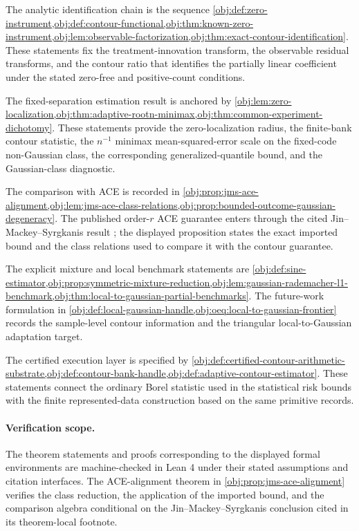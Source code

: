 \documentclass[11pt]{article}
\begin{document}
The analytic identification chain is the sequence \cref{obj:def:zero-instrument,obj:def:contour-functional,obj:thm:known-zero-instrument,obj:lem:observable-factorization,obj:thm:exact-contour-identification}. These statements fix the treatment-innovation transform, the observable residual transforms, and the contour ratio that identifies the partially linear coefficient under the stated zero-free and positive-count conditions.

The fixed-separation estimation result is anchored by \cref{obj:lem:zero-localization,obj:thm:adaptive-rootn-minimax,obj:thm:common-experiment-dichotomy}. These statements provide the zero-localization radius, the finite-bank contour statistic, the \(n^{-1}\) minimax mean-squared-error scale on the fixed-code non-Gaussian class, the corresponding generalized-quantile bound, and the Gaussian-class diagnostic.

The comparison with ACE is recorded in \cref{obj:prop:jms-ace-alignment,obj:lem:jms-ace-class-relations,obj:prop:bounded-outcome-gaussian-degeneracy}. The published order-\(r\) ACE guarantee enters through the cited Jin--Mackey--Syrgkanis result \citep{JinMackeySyrgkanis2025}; the displayed proposition states the exact imported bound and the class relations used to compare it with the contour guarantee.

The explicit mixture and local benchmark statements are \cref{obj:def:sine-estimator,obj:prop:symmetric-mixture-reduction,obj:lem:gaussian-rademacher-l1-benchmark,obj:thm:local-to-gaussian-partial-benchmarks}. The future-work formulation in \cref{obj:def:local-gaussian-handle,obj:oeq:local-to-gaussian-frontier} records the sample-level contour information and the triangular local-to-Gaussian adaptation target.

The certified execution layer is specified by \cref{obj:def:certified-contour-arithmetic-substrate,obj:def:contour-bank-handle,obj:def:adaptive-contour-estimator}. These statements connect the ordinary Borel statistic used in the statistical risk bounds with the finite represented-data construction based on the same primitive records.

\paragraph{Verification scope.}
The theorem statements and proofs corresponding to the displayed formal environments are machine-checked in Lean 4 under their stated assumptions and citation interfaces. The ACE-alignment theorem in \cref{obj:prop:jms-ace-alignment} verifies the class reduction, the application of the imported bound, and the comparison algebra conditional on the Jin--Mackey--Syrgkanis conclusion cited in its theorem-local footnote.
\end{document}
